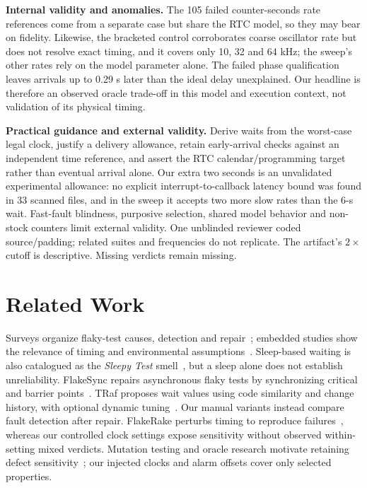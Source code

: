 \documentclass[sigconf,nonacm,balance=false]{acmart}
\begin{document}
\textbf{Internal validity and anomalies.} The 105 failed counter-seconds rate references come from a separate case but share the RTC model, so they may bear on fidelity. Likewise, the bracketed control corroborates coarse oscillator rate but does not resolve exact timing, and it covers only 10, 32 and 64 kHz; the sweep's other rates rely on the model parameter alone. The failed phase qualification leaves arrivals up to 0.29 s later than the ideal delay unexplained. Our headline is therefore an observed oracle trade-off in this model and execution context, not validation of its physical timing.\par\smallskip
\textbf{Practical guidance and external validity.} Derive waits from the worst-case legal clock, justify a delivery allowance, retain early-arrival checks against an independent time reference, and assert the RTC calendar/programming target rather than eventual arrival alone. Our extra two seconds is an unvalidated experimental allowance: no explicit interrupt-to-callback latency bound was found in 33 scanned files, and in the sweep it accepts two more slow rates than the 6-s wait. Fast-fault blindness, purposive selection, shared model behavior and non-stock counters limit external validity. One unblinded reviewer coded source/padding; related suites and frequencies do not replicate. The artifact's $2\times$ cutoff is descriptive. Missing verdicts remain missing.

\section{Related Work}
Surveys organize flaky-test causes, detection and repair~\cite{parrysurvey}; embedded studies show the relevance of timing and environmental assumptions~\cite{strandberg2020}. Sleep-based waiting is also catalogued as the \emph{Sleepy Test} smell~\cite{sleepy}, but a sleep alone does not establish unreliability. FlakeSync repairs asynchronous flaky tests by synchronizing critical and barrier points~\cite{flakesync}. TRaf proposes wait values using code similarity and change history, with optional dynamic tuning~\cite{traf}. Our manual variants instead compare fault detection after repair. FlakeRake perturbs timing to reproduce failures~\cite{rahman2024flakerake}, whereas our controlled clock settings expose sensitivity without observed within-setting mixed verdicts. Mutation testing and oracle research motivate retaining defect sensitivity~\cite{jia2011mutation,barr2015oracle}; our injected clocks and alarm offsets cover only selected properties.
\end{document}
